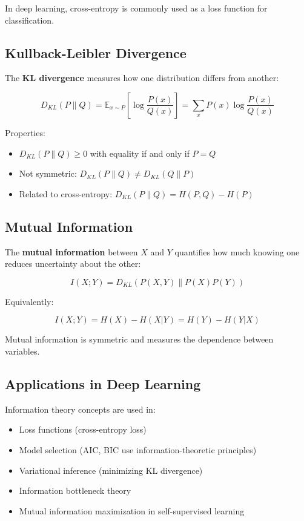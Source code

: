 In deep learning, cross-entropy is commonly used as a loss function for classification.

\subsection{Kullback-Leibler Divergence}

The \textbf{KL divergence} measures how one distribution differs from another:

\begin{equation}
D_{KL}(P \| Q) = \mathbb{E}_{x \sim P}\left[\log \frac{P(x)}{Q(x)}\right] = \sum_{x} P(x) \log \frac{P(x)}{Q(x)}
\end{equation}

Properties:
\begin{itemize}
    \item $D_{KL}(P \| Q) \geq 0$ with equality if and only if $P = Q$
    \item Not symmetric: $D_{KL}(P \| Q) \neq D_{KL}(Q \| P)$
    \item Related to cross-entropy: $D_{KL}(P \| Q) = H(P, Q) - H(P)$
\end{itemize}

\subsection{Mutual Information}

The \textbf{mutual information} between $X$ and $Y$ quantifies how much knowing one reduces uncertainty about the other:

\begin{equation}
I(X; Y) = D_{KL}(P(X, Y) \| P(X)P(Y))
\end{equation}

Equivalently:

\begin{equation}
I(X; Y) = H(X) - H(X|Y) = H(Y) - H(Y|X)
\end{equation}

Mutual information is symmetric and measures the dependence between variables.

\subsection{Applications in Deep Learning}

Information theory concepts are used in:
\begin{itemize}
    \item Loss functions (cross-entropy loss)
    \item Model selection (AIC, BIC use information-theoretic principles)
    \item Variational inference (minimizing KL divergence)
    \item Information bottleneck theory
    \item Mutual information maximization in self-supervised learning
\end{itemize}
